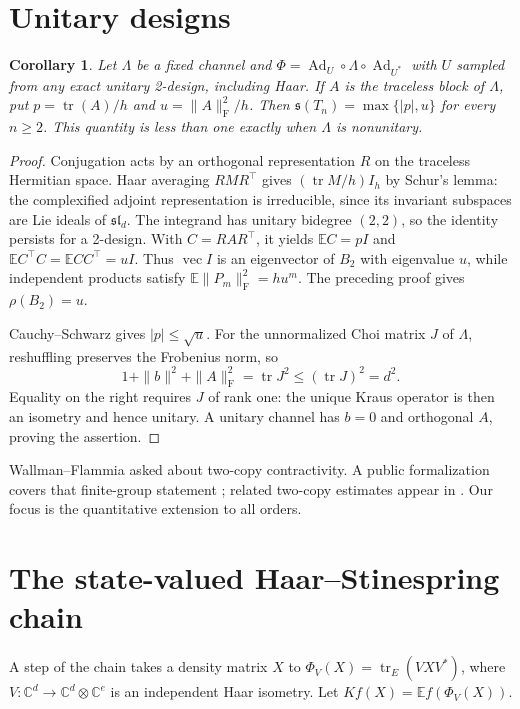 \documentclass[11pt]{article}
\newtheorem{corollary}[theorem]{Corollary}
\DeclareMathOperator{\tr}{tr}
\DeclareMathOperator{\Ad}{Ad}
\newcommand{\E}{\mathbb E}
\newcommand{\C}{\mathbb C}
\newcommand{\s}{\mathfrak s}
\newcommand{\F}{\mathrm F}
\begin{document}
\section{Unitary designs}
\begin{corollary}\label{t:design}
Let $\Lambda$ be a fixed channel and $\Phi=\Ad_U\circ\Lambda\circ\Ad_{U^*}$ with $U$ sampled from any exact unitary 2-design, including Haar. If $A$ is the traceless block of $\Lambda$, put $p=\tr(A)/h$ and $u=\|A\|_{\F}^2/h$. Then $\s(T_n)=\max\{|p|,u\}$ for every $n\ge2$. This quantity is less than one exactly when $\Lambda$ is nonunitary.
\end{corollary}
\begin{proof}
Conjugation acts by an orthogonal representation $R$ on the traceless Hermitian space. Haar averaging $RMR^\top$ gives $(\tr M/h)I_h$ by Schur's lemma: the complexified adjoint representation is irreducible, since its invariant subspaces are Lie ideals of $\mathfrak{sl}_d$. The integrand has unitary bidegree $(2,2)$, so the identity persists for a 2-design. With $C=RAR^\top$, it yields $\E C=pI$ and $\E C^\top C=\E CC^\top=uI$. Thus $\operatorname{vec}I$ is an eigenvector of $B_2$ with eigenvalue $u$, while independent products satisfy $\E\|P_m\|_{\F}^2=hu^m$. The preceding proof gives $\rho(B_2)=u$.

Cauchy--Schwarz gives $|p|\le\sqrt u$. For the unnormalized Choi matrix $J$ of $\Lambda$, reshuffling preserves the Frobenius norm, so
\[
 1+\|b\|^2+\|A\|_{\F}^2=\tr J^2\le(\tr J)^2=d^2.
\]
Equality on the right requires $J$ of rank one: the unique Kraus operator is then an isometry and hence unitary. A unitary channel has $b=0$ and orthogonal $A$, proving the assertion.
\end{proof}
Wallman--Flammia \cite{wf} asked about two-copy contractivity. A public formalization covers that finite-group statement \cite{tt}; related two-copy estimates appear in \cite{helsen,unitarity}. Our focus is the quantitative extension to all orders.

\section{The state-valued Haar--Stinespring chain}
A step of the chain takes a density matrix $X$ to $\Phi_V(X)=\tr_E(VXV^*)$, where $V:\C^d\to\C^d\otimes\C^e$ is an independent Haar isometry. Let $Kf(X)=\E f(\Phi_V(X))$.
\end{document}
